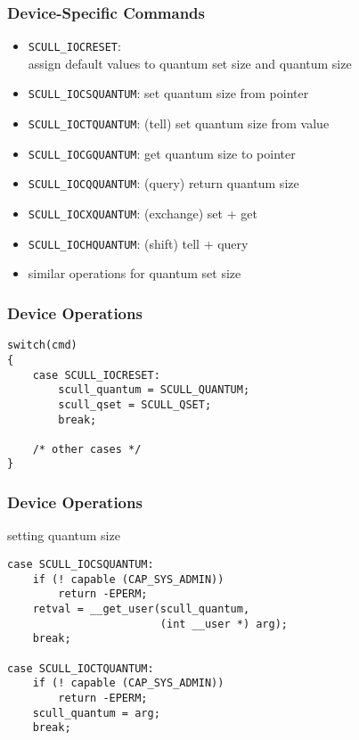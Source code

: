 \documentclass[dvipsnames]{beamer}
\begin{document}
\begin{frame}
  \frametitle{Device-Specific Commands}

  \begin{exampleblock}{}
    \begin{itemize}
      \item \lstinline|SCULL_IOCRESET|:\\
        assign default values to quantum set size and quantum size

      \pause
      \medskip
      \item \lstinline|SCULL_IOCSQUANTUM|: set quantum size from pointer
      \item \lstinline|SCULL_IOCTQUANTUM|: (tell) set quantum size from value

      \pause
      \item \lstinline|SCULL_IOCGQUANTUM|: get quantum size to pointer
      \item \lstinline|SCULL_IOCQQUANTUM|: (query) return quantum size

      \pause
      \item \lstinline|SCULL_IOCXQUANTUM|: (exchange) set + get
      \item \lstinline|SCULL_IOCHQUANTUM|: (shift) tell + query

      \pause
      \medskip
      \item similar operations for quantum set size
    \end{itemize}
  \end{exampleblock}
\end{frame}

\begin{frame}[fragile]
  \frametitle{Device Operations}

  \begin{exampleblock}{}
    \begin{lstlisting}
switch(cmd)
{
    case SCULL_IOCRESET:
        scull_quantum = SCULL_QUANTUM;
        scull_qset = SCULL_QSET;
        break;

    /* other cases */
}
    \end{lstlisting}
  \end{exampleblock}
\end{frame}

\begin{frame}[fragile]
  \frametitle{Device Operations}

  \begin{exampleblock}{setting quantum size}
    \begin{lstlisting}
case SCULL_IOCSQUANTUM:
    if (! capable (CAP_SYS_ADMIN))
        return -EPERM;
    retval = __get_user(scull_quantum,
                        (int __user *) arg);
    break;

case SCULL_IOCTQUANTUM:
    if (! capable (CAP_SYS_ADMIN))
        return -EPERM;
    scull_quantum = arg;
    break;
    \end{lstlisting}
  \end{exampleblock}
\end{frame}
\end{document}
